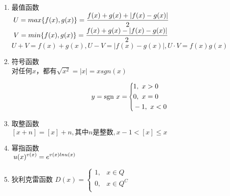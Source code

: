 \begin{enumerate}
    \item 最值函数\\
    $\displaystyle\hspace{.2em} U=max\{f(x),g(x)\}= \frac{f(x)+g(x)+|f(x)-g(x)|}{2}$\\
    $\displaystyle\hspace{.2em} V=min\{f(x),g(x)\}= \frac{f(x)+g(x)-|f(x)-g(x)|}{2}$\\
    $U+V=f(x)+g(x),U-V=|f(x)-g(x)|,U \cdot V=f(x)g(x)$

    \item 符号函数\\
    对任何$x$，都有$\sqrt{x^2}=|x|=xsgn(x)$\par
    \begin{equation*}
        y=\text{sgn}\ x=
        \scaleleftright[6pt]{\biggl\{}{
            \begin{aligned}
                & 1,\ x>0 \\
                & 0,\ x=0 \\
                & -1,\ x<0
            \end{aligned}
            }{.}
        \end{equation*}
    
    \item 取整函数\\
    $[x+n]=[x]+n,其中n是整数,x-1<[x]\le x $
    
    \item 幂指函数\\
    $\displaystyle\hspace{.2em} u(x)^{v(x)}=e^{v(x)lnu(x)}$
    
    \item 狄利克雷函数
    {
        $D(x)=\left\{
            \begin{array}{cl}
                1,&x\in Q\\
                0,&x\in Q^C\\
            \end{array}
            \right.$
    }
\end{enumerate}



